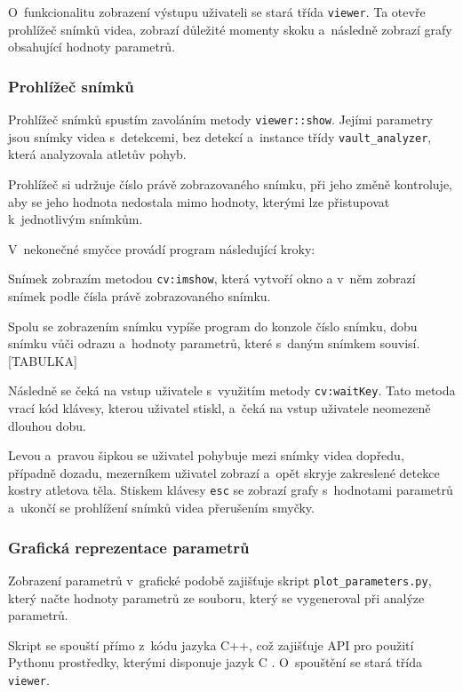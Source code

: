 O~funkcionalitu zobrazení výstupu uživateli se stará třída \texttt{viewer}. Ta otevře prohlížeč snímků videa, zobrazí důležité momenty skoku a~následně zobrazí grafy obsahující hodnoty parametrů.


\subsubsection{Prohlížeč snímků}

Prohlížeč snímků spustím zavoláním metody \texttt{viewer::show}. Jejími parametry jsou snímky videa s~detekcemi, bez detekcí a~instance třídy \texttt{vault\_analyzer}, která analyzovala atletův pohyb.

Prohlížeč si udržuje číslo právě zobrazovaného snímku, při jeho změně kontroluje, aby se jeho hodnota nedostala mimo hodnoty, kterými lze přistupovat k~jednotlivým snímkům.

V~nekonečné smyčce provádí program následující kroky:

Snímek zobrazím metodou \texttt{cv\::imshow}, která vytvoří okno a v~něm zobrazí snímek podle čísla právě zobrazovaného snímku.

Spolu se zobrazením snímku vypíše program do konzole číslo snímku, dobu snímku vůči odrazu a~hodnoty parametrů, které s~daným snímkem souvisí. [TABULKA]

Následně se čeká na vstup uživatele s~využitím metody \texttt{cv\::waitKey}. Tato metoda vrací kód klávesy, kterou uživatel stiskl, a~čeká na vstup uživatele neomezeně dlouhou dobu.

Levou a~pravou šipkou se uživatel pohybuje mezi snímky videa dopředu, případně dozadu, mezerníkem uživatel zobrazí a~opět skryje zakreslené detekce kostry atletova těla. Stiskem klávesy \texttt{esc} se zobrazí grafy s~hodnotami parametrů a~ukončí se prohlížení snímků videa přerušením smyčky.


\subsubsection{Grafická reprezentace parametrů}

Zobrazení parametrů v~grafické podobě zajišťuje skript \texttt{plot\_parameters.py}, který načte hodnoty parametrů ze souboru, který se vygeneroval při analýze parametrů.

Skript se spouští přímo z~kódu jazyka C++, což zajišťuje API pro použití Pythonu prostředky, kterými disponuje jazyk C \citep{PythonC}. O~spouštění se stará třída \texttt{viewer}.

